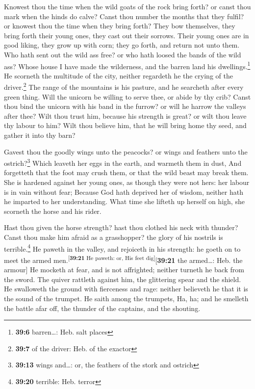  Knowest thou the time when the wild goats of the rock
bring forth? or canst thou mark when the hinds do calve? 
Canst thou number the months that they fulfil? or knowest thou the time
when they bring forth?  They bow themselves, they bring
forth their young ones, they cast out their sorrows. 
Their young ones are in good liking, they grow up with corn; they go
forth, and return not unto them.  Who hath sent out the
wild ass free? or who hath loosed the bands of the wild ass?
 Whose house I have made the wilderness, and the barren
land his dwellings.\footnote{\textbf{39:6} barren\ldots: Heb. salt
  places}  He scorneth the multitude of the city, neither
regardeth he the crying of the driver.\footnote{\textbf{39:7} of the
  driver: Heb. of the exactor}  The range of the mountains
is his pasture, and he searcheth after every green thing. 
Will the unicorn be willing to serve thee, or abide by thy crib?
 Canst thou bind the unicorn with his band in the furrow?
or will he harrow the valleys after thee?  Wilt thou
trust him, because his strength is great? or wilt thou leave thy labour
to him?  Wilt thou believe him, that he will bring home
thy seed, and gather it into thy barn?

 Gavest thou the goodly wings unto the peacocks? or wings
and feathers unto the ostrich?\footnote{\textbf{39:13} wings and\ldots:
  or, the feathers of the stork and ostrich}  Which
leaveth her eggs in the earth, and warmeth them in dust, 
And forgetteth that the foot may crush them, or that the wild beast may
break them.  She is hardened against her young ones, as
though they were not hers: her labour is in vain without fear;
 Because God hath deprived her of wisdom, neither hath he
imparted to her understanding.  What time she lifteth up
herself on high, she scorneth the horse and his rider.

 Hast thou given the horse strength? hast thou clothed
his neck with thunder?  Canst thou make him afraid as a
grasshopper? the glory of his nostrils is terrible.\footnote{\textbf{39:20}
  terrible: Heb. terror}  He paweth in the valley, and
rejoiceth in his strength: he goeth on to meet the armed
men.\textsuperscript{{[}\textbf{39:21} He paweth: or, His feet
dig{]}}{[}\textbf{39:21} the armed\ldots: Heb. the armour{]}
 He mocketh at fear, and is not affrighted; neither
turneth he back from the sword.  The quiver rattleth
against him, the glittering spear and the shield.  He
swalloweth the ground with fierceness and rage: neither believeth he
that it is the sound of the trumpet.  He saith among the
trumpets, Ha, ha; and he smelleth the battle afar off, the thunder of
the captains, and the shouting.

